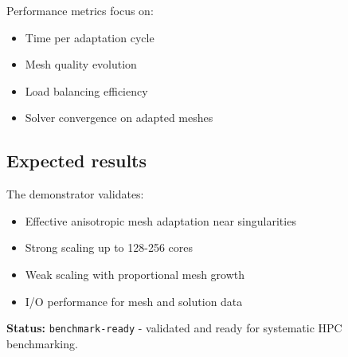 Performance metrics focus on:
\begin{itemize}
\item Time per adaptation cycle
\item Mesh quality evolution
\item Load balancing efficiency
\item Solver convergence on adapted meshes
\end{itemize}

\subsection{Expected results}

The demonstrator validates:
\begin{itemize}
\item Effective anisotropic mesh adaptation near singularities
\item Strong scaling up to 128-256 cores
\item Weak scaling with proportional mesh growth
\item I/O performance for mesh and solution data
\end{itemize}

\textbf{Status:} \texttt{benchmark-ready} - validated and ready for systematic HPC benchmarking.
